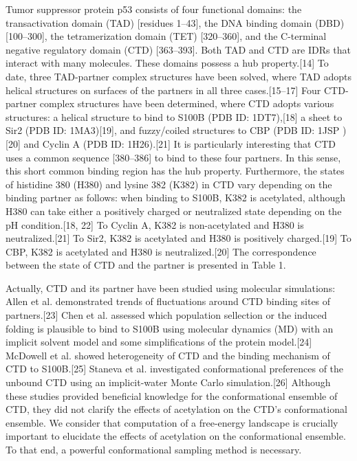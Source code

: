Tumor suppressor protein p53 consists of four functional domains: the transactivation domain (TAD) [residues 1–43], the DNA binding domain (DBD) [100–300], the tetramerization domain (TET) [320–360], and the C-terminal negative regulatory domain (CTD) [363–393]. Both TAD and CTD are IDRs that interact with many molecules. These domains possess a hub property.[14] To date, three TAD-partner complex structures have been solved, where TAD adopts helical structures on surfaces of the partners in all three cases.[15–17] Four CTD-partner complex structures have been determined, where CTD adopts various structures: a helical structure to bind to S100B (PDB ID: 1DT7),[18] a sheet to Sir2 (PDB ID: 1MA3)[19], and fuzzy/coiled structures to CBP (PDB ID: 1JSP )[20] and Cyclin A (PDB ID: 1H26).[21] It is particularly interesting that CTD uses a common sequence [380–386] to bind to these four partners. In this sense, this short common binding region has the hub property. Furthermore, the states of histidine 380 (H380) and lysine 382 (K382) in CTD vary depending on the binding partner as follows: when binding to S100B, K382 is acetylated, although H380 can take either a positively charged or neutralized state depending on the pH condition.[18, 22] To Cyclin A, K382 is non-acetylated and H380 is neutralized.[21] To Sir2, K382 is acetylated and H380 is positively charged.[19] To CBP, K382 is acetylated and H380 is neutralized.[20] The correspondence between the state of CTD and the partner is presented in Table 1.

Actually, CTD and its partner have been studied using molecular simulations: Allen et al. demonstrated trends of fluctuations around CTD binding sites of partners.[23] Chen et al. assessed which population sellection or the induced folding is plausible to bind to S100B using molecular dynamics (MD) with an implicit solvent model and some simplifications of the protein model.[24] McDowell et al. showed heterogeneity of CTD and the binding mechanism of CTD to S100B.[25] Staneva et al. investigated conformational preferences of the unbound CTD using an implicit-water Monte Carlo simulation.[26] Although these studies provided beneficial knowledge for the conformational ensemble of CTD, they did not clarify the effects of acetylation on the CTD’s conformational ensemble. We consider that computation of a free-energy landscape is crucially important to elucidate the effects of acetylation on the conformational ensemble. To that end, a powerful conformational sampling method is necessary.

